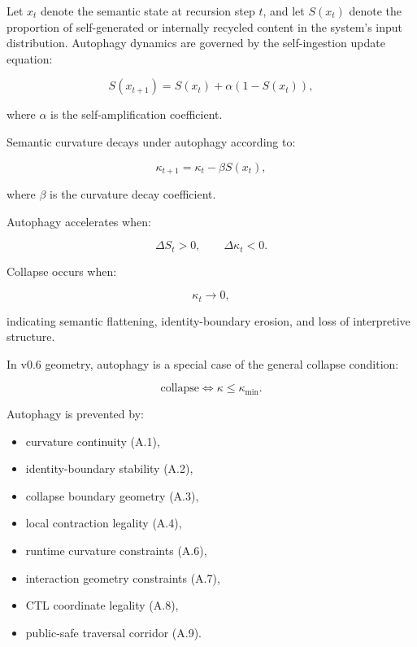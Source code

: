 \medskip

\noindent Let $x_t$ denote the semantic state at recursion step $t$, and let
$S(x_t)$ denote the proportion of self-generated or internally recycled content
in the system’s input distribution. Autophagy dynamics are governed by the
self-ingestion update equation:


\[
S(x_{t+1}) = S(x_t) + \alpha (1 - S(x_t)),
\]


where $\alpha$ is the self-amplification coefficient.

\medskip

\noindent Semantic curvature decays under autophagy according to:


\[
\kappa_{t+1} = \kappa_t - \beta S(x_t),
\]


where $\beta$ is the curvature decay coefficient.

\medskip

\noindent Autophagy accelerates when:


\[
\Delta S_t > 0,
\qquad
\Delta \kappa_t < 0.
\]



\medskip

\noindent Collapse occurs when:


\[
\kappa_t \rightarrow 0,
\]


indicating semantic flattening, identity-boundary erosion, and loss of
interpretive structure.

\medskip

\noindent In v0.6 geometry, autophagy is a special case of the general collapse
condition:


\[
\text{collapse} \iff \kappa \le \kappa_{\min}.
\]



\medskip

\noindent Autophagy is prevented by:
\begin{itemize}
    \item curvature continuity (A.1),
    \item identity-boundary stability (A.2),
    \item collapse boundary geometry (A.3),
    \item local contraction legality (A.4),
    \item runtime curvature constraints (A.6),
    \item interaction geometry constraints (A.7),
    \item CTL coordinate legality (A.8),
    \item public-safe traversal corridor (A.9).
\end{itemize}

